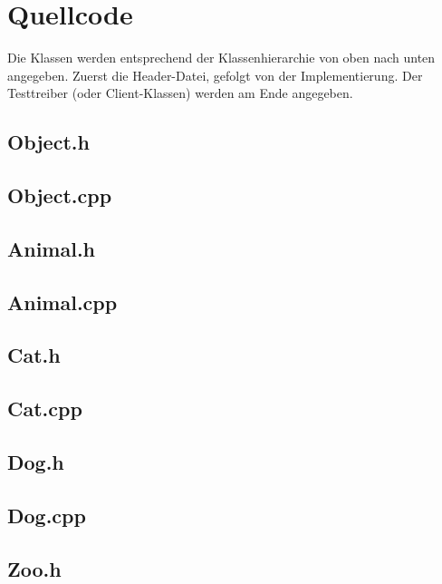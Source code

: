 \documentclass[12pt,naustrian,a4widepaper]{scrartcl}
\begin{document}
\clearpage
\section{Quellcode}
\color{blue}
Die Klassen werden entsprechend der Klassenhierarchie von oben nach unten angegeben. Zuerst die Header-Datei, gefolgt von der Implementierung.
Der Testtreiber (oder Client-Klassen) werden am Ende angegeben.
\color{black}

\subsection{Object.h}


\subsection{Object.cpp}


\subsection{Animal.h}


\subsection{Animal.cpp}


\subsection{Cat.h}


\subsection{Cat.cpp}


\subsection{Dog.h}


\subsection{Dog.cpp}


\subsection{Zoo.h}

\end{document}
